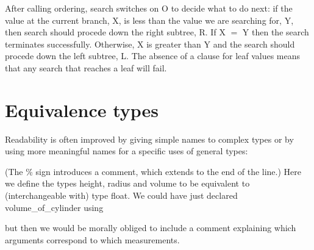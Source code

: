 \documentclass[a4paper,11pt,notitlepage,onecolumn]{book}
\begin{document}
After calling \textsf{ordering}, \textsf{search} switches on \textsf{O} to decide what to do
next: if the value at the current \textsf{branch}, \textsf{X}, is less than the value we
are searching for, \textsf{Y}, then search should procede down the right subtree,
\textsf{R}.  If \textsf{X {\ensuremath{=}} Y} then the search terminates successfully.  Otherwise, \textsf{X} is
greater than \textsf{Y} and the search should procede down the left subtree, \textsf{L}.
The absence of a clause for \textsf{leaf} values means that any search that reaches
a \textsf{leaf} will fail.



\section{Equivalence types}

Readability is often improved by giving simple names to complex types or
by using more meaningful names for a specific uses of general types:
\begin{small}

\begin{ptabular}
\nextline
{}
\nextline
{}
\nextline
\nextline
{}
\nextline
{}
\nextline
\end{ptabular}

\end{small}
(The \textsf{\%} sign introduces a comment, which extends to the end of the line.)
Here we define the types \textsf{height}, \textsf{radius} and \textsf{volume} to be equivalent to
(\ie interchangeable with) type \textsf{float}.  We could have just declared
\textsf{volume\_of\_cylinder} using
\begin{small}

\begin{ptabular}
\nextline
\end{ptabular}

\end{small}
but then we would be morally obliged to include a comment explaining which
arguments correspond to which measurements.
\end{document}
